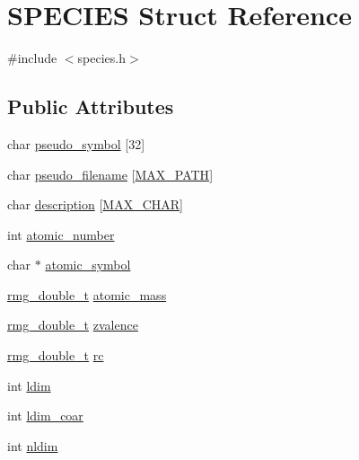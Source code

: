 \hypertarget{struct_s_p_e_c_i_e_s}{\section{S\-P\-E\-C\-I\-E\-S Struct Reference}
\label{struct_s_p_e_c_i_e_s}
}


{\ttfamily \#include $<$species.\-h$>$}

\subsection*{Public Attributes}
\begin{DoxyCompactItemize}
\item 
char \hyperlink{struct_s_p_e_c_i_e_s_a094bb93267d26eb09aad4a0bc84b288b}{pseudo\-\_\-symbol} \mbox{[}32\mbox{]}
\item 
char \hyperlink{struct_s_p_e_c_i_e_s_ab5a1a6d74ace472f3eb90a98332013f8}{pseudo\-\_\-filename} \mbox{[}\hyperlink{_t_d_d_f_t_2_headers_2params_8h_ab99ded389af74001a6298fc9e44e74e5}{M\-A\-X\-\_\-\-P\-A\-T\-H}\mbox{]}
\item 
char \hyperlink{struct_s_p_e_c_i_e_s_adeaff9956fe2e820c6050e7a2dee34d3}{description} \mbox{[}\hyperlink{_t_d_d_f_t_2_headers_2params_8h_a82acb32225c05e9aa4c524c40bc5852a}{M\-A\-X\-\_\-\-C\-H\-A\-R}\mbox{]}
\item 
int \hyperlink{struct_s_p_e_c_i_e_s_ae23765d11a7cda24a872b3eb16fa4729}{atomic\-\_\-number}
\item 
char $\ast$ \hyperlink{struct_s_p_e_c_i_e_s_a1200a68f7c0bed17e60fcd36db794ea9}{atomic\-\_\-symbol}
\item 
\hyperlink{rmgtypes_8h_aaa16921c14f121c56eaa42390a340db8}{rmg\-\_\-double\-\_\-t} \hyperlink{struct_s_p_e_c_i_e_s_a9e530a693db66a5d950f1b938f2798e3}{atomic\-\_\-mass}
\item 
\hyperlink{rmgtypes_8h_aaa16921c14f121c56eaa42390a340db8}{rmg\-\_\-double\-\_\-t} \hyperlink{struct_s_p_e_c_i_e_s_a3b02cd8e29922454737ecb5ef7be5016}{zvalence}
\item 
\hyperlink{rmgtypes_8h_aaa16921c14f121c56eaa42390a340db8}{rmg\-\_\-double\-\_\-t} \hyperlink{struct_s_p_e_c_i_e_s_aef0a165ae6573d48d9f00dc5993621f0}{rc}
\item 
int \hyperlink{struct_s_p_e_c_i_e_s_ab74c2f989d77e1a7f50ae5d6e10bd059}{ldim}
\item 
int \hyperlink{struct_s_p_e_c_i_e_s_a5b323c3df2501e6fd80ebd945e0681e6}{ldim\-\_\-coar}
\item 
int \hyperlink{struct_s_p_e_c_i_e_s_ad33e4d18442a615d7e833f9825d475f3}{nldim}

\end{DoxyCompactItemize}
